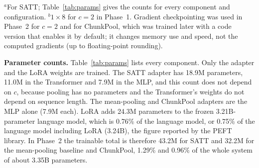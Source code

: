 \documentclass[conference]{IEEEtran}
\begin{document}
\begin{table}[t]
\centering
\caption{Training settings, identical for all configurations except where
noted.}
\label{tab:training}
\footnotesize
{}

\vspace{2pt}
\parbox{\columnwidth}{\scriptsize $^{a}$For SATT; Table~\ref{tab:params}
gives the counts for every component and configuration.
$^{b}$$1\times8$ for $c=2$ in Phase~1. Gradient checkpointing was used in
Phase~2 for $c=2$ and for ChunkPool, which was trained later with a code
version that enables it by default; it changes memory use and speed, not the
computed gradients (up to floating-point rounding).}
\end{table}

\textbf{Parameter counts.} Table~\ref{tab:params} lists every component.
Only the adapter and the LoRA weights are trained. The SATT adapter has
18.9M parameters, 11.0M in the Transformer and 7.9M in the MLP, and this
count does not depend on $c$, because pooling has no parameters and the
Transformer's weights do not depend on sequence length. The mean-pooling
and ChunkPool adapters are the MLP alone (7.9M each). LoRA adds 24.3M parameters to the frozen
3.21B-parameter language model, which is 0.76\% of the language model, or
0.75\% of the language model including LoRA (3.24B), the figure reported by
the PEFT library. In Phase~2 the trainable total is therefore 43.2M for SATT
and 32.2M for the mean-pooling baseline and ChunkPool, 1.29\% and 0.96\% of the whole
system of about 3.35B parameters.
\end{document}
